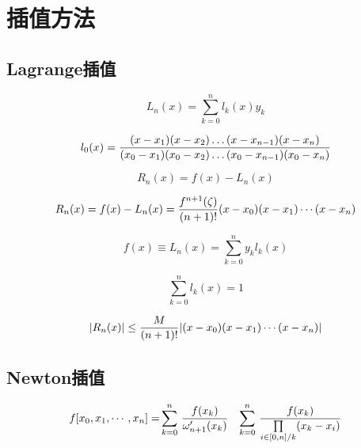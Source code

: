 \chapter{插值方法}

\section{Lagrange插值}



\begin{equation}
L_n(x)=\sum_{k=0}^n l_k(x)y_k
\end{equation}

\begin{equation}
l_0(x) = {{(x-x_1)(x-x_2)\ldots(x-x_{n-1})(x-x_n)}\over{(x_0-x_1)(x_0-x_2)\ldots(x_0-x_{n-1})(x_0-x_n)}}
\end{equation}

\begin{equation*}
R_n(x)=f(x) - L_n(x)
\end{equation*}

\begin{equation}
R_n(x) = f(x) - L_n(x) = {f^{n+1}(\zeta)\over(n+1)!}(x-x_0)(x-x_1)\cdots(x-x_n)
\end{equation}

\begin{equation}
f(x)\equiv L_n(x) = \sum_{k=0}^{n}y_kl_k(x)
\end{equation}

\begin{equation}
\sum_{k=0}^nl_k(x) = 1
\end{equation}

\begin{equation}
|R_n(x)|\le {M\over(n+1)!}|(x-x_0)(x-x_1)\cdots(x-x_n)|
\end{equation}


\section{Newton插值}

\begin{equation}
    \begin{aligned}
        f[x_0,x_1,\cdots,x_n] = &\sum\limits_{k=0}^n\,{f(x_k)\over{\omega^\prime_{n+1}(x_k)}}
                                &\sum\limits_{k=0}^n\,{f(x_k)\over{\prod\limits_{i\in[0,n]/k}(x_k - x_i)}}
    \end{aligned}
\end{equation}

